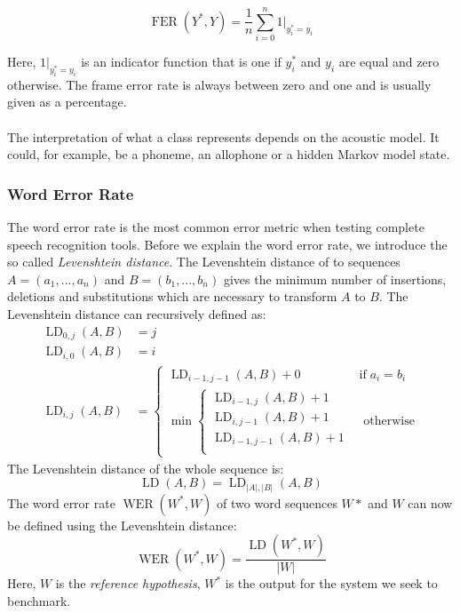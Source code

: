 \[
\operatorname{FER}(Y^*, Y) = \frac{1}{n} \sum_{i = 0}^n 1|_{y^*_i = y_i} 
\]

Here, $1|_{y^*_i = y_i}$ is an indicator function that is one if $y^*_i$ and $y_i$ are equal and zero otherwise. The frame error rate is always between zero and one and is usually given as a percentage. 
\\ \\ 
The interpretation of what a class represents depends on the acoustic model. It could, for example, be a phoneme, an allophone or a hidden Markov model state. 

\subsubsection{Word Error Rate}
The word error rate is the most common error metric when testing complete speech recognition tools. Before we explain the word error rate, we introduce the so called \textit{Levenshtein distance}. The Levenshtein distance of to sequences $A = (a_1,...,a_n)$ and $B=(b_1,...,b_n)$ gives the minimum number of insertions, deletions and substitutions which are necessary to transform $A$ to $B$. The Levenshtein distance can recursively defined as:
\begin{align*}
\operatorname{LD}_{0,j}(A, B) &= j \\
\operatorname{LD}_{i,0}(A, B) &= i \\
\operatorname{LD}_{i,j}(A, B) &= \begin{cases}
	\operatorname{LD}_{i-1,j-1}(A, B) + 0 & \text{if} \; a_i = b_i \\
	\min \begin{cases}
		\operatorname{LD}_{i-1,j}(A, B) + 1 \\
		\operatorname{LD}_{i,j-1}(A, B) + 1 \\
		\operatorname{LD}_{i-1,j-1}(A, B) + 1\\
	\end{cases} & \text{ otherwise}
\end{cases}
\end{align*}
\noindent
The Levenshtein distance of the whole sequence is:
\[
\operatorname{LD}(A, B) = \operatorname{LD}_{|A|, |B|}(A, B)
\]
The word error rate $\operatorname{WER}(W^*, W)$ of two word sequences $W*$ and $W$ can now be defined using the Levenshtein distance: \\
\[
\operatorname{WER}(W^*, W) = \frac{\operatorname{LD}(W^*,W)}{|W|}
\]
Here, $W$ is the \textit{reference hypothesis}, $W^*$ is the output for the system we seek to benchmark.
